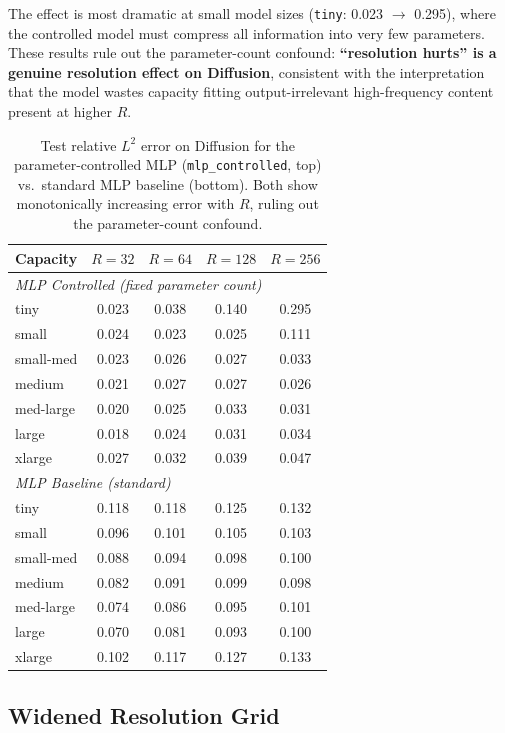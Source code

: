 \documentclass[11pt]{article}
\begin{document}
The effect is most dramatic at small model sizes (\texttt{tiny}:
0.023 $\to$ 0.295), where the controlled model must compress all
information into very few parameters.
These results rule out the parameter-count confound:
\textbf{``resolution hurts'' is a genuine resolution effect on Diffusion},
consistent with the interpretation that the model wastes capacity
fitting output-irrelevant high-frequency content present at higher $R$.

\begin{table}[h]
\centering
\caption{Test relative $L^2$ error on Diffusion for the parameter-controlled MLP
(\texttt{mlp\_controlled}, top) vs.\ standard MLP baseline (bottom). Both show
monotonically increasing error with $R$, ruling out the parameter-count confound.}
\label{tab:mlp-controlled}
\small
\begin{tabular}{lcccc}
\toprule
Capacity & $R{=}32$ & $R{=}64$ & $R{=}128$ & $R{=}256$ \\
\midrule
\multicolumn{5}{l}{\emph{MLP Controlled (fixed parameter count)}} \\
tiny      & 0.023 & 0.038 & 0.140 & 0.295 \\
small     & 0.024 & 0.023 & 0.025 & 0.111 \\
small-med & 0.023 & 0.026 & 0.027 & 0.033 \\
medium    & 0.021 & 0.027 & 0.027 & 0.026 \\
med-large & 0.020 & 0.025 & 0.033 & 0.031 \\
large     & 0.018 & 0.024 & 0.031 & 0.034 \\
xlarge    & 0.027 & 0.032 & 0.039 & 0.047 \\
\midrule
\multicolumn{5}{l}{\emph{MLP Baseline (standard)}} \\
tiny      & 0.118 & 0.118 & 0.125 & 0.132 \\
small     & 0.096 & 0.101 & 0.105 & 0.103 \\
small-med & 0.088 & 0.094 & 0.098 & 0.100 \\
medium    & 0.082 & 0.091 & 0.099 & 0.098 \\
med-large & 0.074 & 0.086 & 0.095 & 0.101 \\
large     & 0.070 & 0.081 & 0.093 & 0.100 \\
xlarge    & 0.102 & 0.117 & 0.127 & 0.133 \\
\bottomrule
\end{tabular}
\end{table}

\subsection{Widened Resolution Grid}
\label{app:wide-res}
\end{document}
